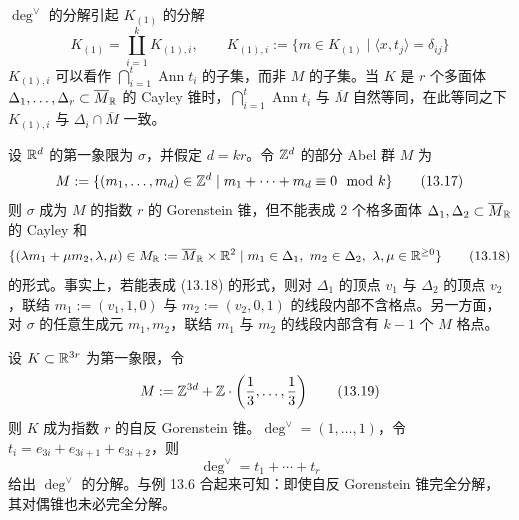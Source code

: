 $\deg^\vee$ 的分解引起 $K_{(1)}$ 的分解
\begin{equation}
    K_{(1)}=\coprod_{i=1}^{k}K_{(1),i},\qquad K_{(1),i}:=\{m\in K_{(1)} \mid \langle x,t_j\rangle=\delta_{ij}\} \tag{13.16}
\end{equation}
$K_{(1),i}$ 可以看作 $\bigcap_{i=1}^{t}\operatorname{Ann}t_i$ 的子集，而非 $M$ 的子集。当 $K$ 是 $r$ 个多面体 $\Delta_1,\dots,\Delta_r\subset\overline{M}_{\mathbb{R}}$ 的 Cayley 锥时，$\bigcap_{i=1}^{t}\operatorname{Ann}t_i$ 与 $\overline{M}$ 自然等同，在此等同之下 $K_{(1),i}$ 与 $\Delta_i\cap\overline{M}$ 一致。

\begin{example}[{[BB97, Example 3.11]}]
设 $\mathbb{R}^d$ 的第一象限为 $\sigma$，并假定 $d=kr$。令 $\mathbb{Z}^d$ 的部分 Abel 群 $M$ 为
\begin{equation}
    M:=\{(m_1,\dots,m_d)\in\mathbb{Z}^d \mid m_1+\cdots+m_d\equiv 0 \mod k\} \tag{13.17}
\end{equation}
则 $\sigma$ 成为 $M$ 的指数 $r$ 的 Gorenstein 锥，但不能表成 2 个格多面体 $\Delta_1,\Delta_2\subset\overline{M}_{\mathbb{R}}$ 的 Cayley 和
\begin{equation}
    \{(\lambda m_1+\mu m_2,\lambda,\mu)\in M_{\mathbb{R}}:=\overline{M}_{\mathbb{R}}\times\mathbb{R}^2 \mid m_1\in\Delta_1,\ m_2\in\Delta_2,\ \lambda,\mu\in\mathbb{R}^{\geq 0}\} \tag{13.18}
\end{equation}
的形式。事实上，若能表成 (13.18) 的形式，则对 $\Delta_1$ 的顶点 $v_1$ 与 $\Delta_2$ 的顶点 $v_2$，联结 $m_1:=(v_1,1,0)$ 与 $m_2:=(v_2,0,1)$ 的线段内部不含格点。另一方面，对 $\sigma$ 的任意生成元 $m_1,m_2$，联结 $m_1$ 与 $m_2$ 的线段内部含有 $k-1$ 个 $M$ 格点。
\end{example}

\begin{example}[{[BB97, Proposition 5.5]}]
设 $K\subset\mathbb{R}^{3r}$ 为第一象限，令
\begin{equation}
    M:=\mathbb{Z}^{3d}+\mathbb{Z}\cdot\left(\frac13,\dots,\frac13\right) \tag{13.19}
\end{equation}
则 $K$ 成为指数 $r$ 的自反 Gorenstein 锥。$\deg^\vee=(1,\dots,1)$，令 $t_i=e_{3i}+e_{3i+1}+e_{3i+2}$，则
\begin{equation}
    \deg^\vee=t_1+\cdots+t_r \tag{13.20}
\end{equation}
给出 $\deg^\vee$ 的分解。与例 13.6 合起来可知：即使自反 Gorenstein 锥完全分解，其对偶锥也未必完全分解。
\end{example}

